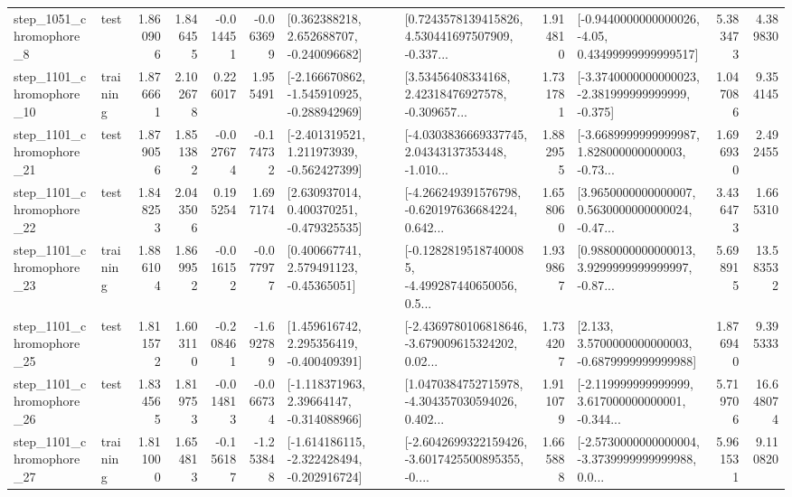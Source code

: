\begin{tabular}{llrrrrllrlrr}
  step\_1051\_chromophore\_8 &      test &      1.860906 &    1.846455 &     -0.014451 & -0.063699 &    [0.362388218, 2.652688707, -0.240096682] &  [0.7243578139415826, 4.530441697507909, -0.337... &       1.914810 &  [-0.9440000000000026, -4.05, 0.43499999999999517] &            5.383473 &          4.389830 \\
 step\_1101\_chromophore\_10 &  training &      1.876661 &    2.102678 &      0.226017 &  1.955491 &  [-2.166670862, -1.545910925, -0.288942969] &  [3.53456408334168, 2.42318476927578, -0.309657... &       1.731781 &  [-3.3740000000000023, -2.381999999999999, -0.375] &            1.047086 &          9.354145 \\
 step\_1101\_chromophore\_21 &      test &      1.879056 &    1.851382 &     -0.027674 & -0.174732 &   [-2.401319521, 1.211973939, -0.562427399] &  [-4.0303836669337745, 2.04343137353448, -1.010... &       1.882955 &  [-3.6689999999999987, 1.828000000000003, -0.73... &            1.696930 &          2.492455 \\
 step\_1101\_chromophore\_22 &      test &      1.848253 &    2.043506 &      0.195254 &  1.697174 &    [2.630937014, 0.400370251, -0.479325535] &  [-4.266249391576798, -0.620197636684224, 0.642... &       1.658060 &  [3.9650000000000007, 0.5630000000000024, -0.47... &            3.436473 &          1.665310 \\
 step\_1101\_chromophore\_23 &  training &      1.886104 &    1.869952 &     -0.016152 & -0.077977 &     [0.400667741, 2.579491123, -0.45365051] &  [-0.12828195187400085, -4.499287440650056, 0.5... &       1.939867 &  [0.9880000000000013, 3.9299999999999997, -0.87... &            5.698915 &         13.583532 \\
 step\_1101\_chromophore\_25 &      test &      1.811572 &    1.603110 &     -0.208461 & -1.692789 &    [1.459616742, 2.295356419, -0.400409391] &  [-2.4369780106818646, -3.679009615324202, 0.02... &       1.734207 &   [2.133, 3.5700000000000003, -0.6879999999999988] &            1.876940 &          9.395333 \\
 step\_1101\_chromophore\_26 &      test &      1.834565 &    1.819753 &     -0.014813 & -0.066734 &    [-1.118371963, 2.39664147, -0.314088966] &  [1.0470384752715978, -4.304357030594026, 0.402... &       1.911079 &  [-2.119999999999999, 3.617000000000001, -0.344... &            5.719706 &         16.648074 \\
 step\_1101\_chromophore\_27 &  training &      1.811000 &    1.654813 &     -0.156187 & -1.253848 &  [-1.614186115, -2.322428494, -0.202916724] &  [-2.6042699322159426, -3.6017425500895355, -0.... &       1.665888 &  [-2.5730000000000004, -3.3739999999999988, 0.0... &            5.961531 &          9.110820 \\

\end{tabular}
